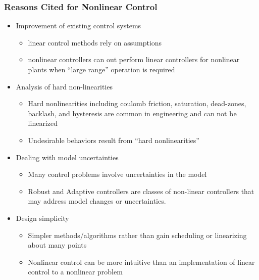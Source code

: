 \documentclass[11pt,handout]{beamer}   %
\begin{document}
\begin{frame}
\frametitle{Reasons Cited for Nonlinear Control}
\begin{itemize}
\item Improvement of existing control systems
\begin{itemize}
\item linear control methods rely on assumptions
\item nonlinear controllers can out perform linear controllers for nonlinear plants when ``large range'' operation is required
\end{itemize}
\item Analysis of hard non-linearities
\begin{itemize}
\item Hard nonlinearities including coulomb friction, saturation, dead-zones, backlash, and hysteresis are common in engineering and can not be linearized
\item Undesirable behaviors result from ``hard nonlinearities''
\end{itemize}
\item Dealing with model uncertainties
\begin{itemize}
\item Many control problems involve uncertainties in the model
\item Robust and Adaptive controllers are classes of non-linear controllers that may address model changes or uncertainties.
\end{itemize}
\item Design simplicity
\begin{itemize}
\item Simpler methods/algorithms rather than gain scheduling or linearizing about many points
\item Nonlinear control can be more intuitive than an implementation of linear control to a nonlinear problem
\end{itemize}
\end{itemize}
\end{frame}
\end{document}
